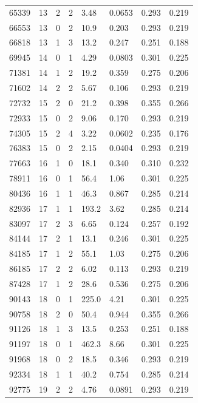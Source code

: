 \documentclass[preview]{standalone}
\begin{document}
{{{\begin{tabular}{L{1.2cm}C{1.2cm} C{0.3cm}C{0.5cm} C{1.4cm}C{1.4cm} C{1.4cm}C{1.4cm}}
  65339  &    13  & 2     &  2 &  3.48  & 0.0653  & 0.293 &  0.219   \\ 
  66553  &    13  & 0     &  2 &  10.9  & 0.203  & 0.293 &  0.219   \\ 
  66818  &    13  & 1     &  3 &  13.2  & 0.247  & 0.251 &  0.188   \\ 
  69945  &    14  & 0     &  1 &  4.29  & 0.0803  & 0.301 &  0.225   \\ 
  71381  &    14  & 1     &  2 &  19.2  & 0.359  & 0.275 &  0.206   \\ 
  71602  &    14  & 2     &  2 &  5.67  & 0.106  & 0.293 &  0.219   \\ 
  72732  &    15  & 2     &  0 &  21.2  & 0.398  & 0.355 &  0.266   \\ 
  72933  &    15  & 0     &  2 &  9.06  & 0.170  & 0.293 &  0.219   \\ 
  74305  &    15  & 2     &  4 &  3.22  & 0.0602  & 0.235 &  0.176   \\ 
  76383  &    15  & 0     &  2 &  2.15  & 0.0404  & 0.293 &  0.219   \\ 
  77663  &    16  & 1     &  0 &  18.1  & 0.340  & 0.310 &  0.232   \\ 
  78911  &    16  & 0     &  1 &  56.4  & 1.06  & 0.301 &  0.225   \\ 
  80436  &    16  & 1     &  1 &  46.3  & 0.867  & 0.285 &  0.214   \\ 
  82936  &    17  & 1     &  1 &  193.2  & 3.62  & 0.285 &  0.214   \\ 
  83097  &    17  & 2     &  3 &  6.65  & 0.124  & 0.257 &  0.192   \\ 
  84144  &    17  & 2     &  1 &  13.1  & 0.246  & 0.301 &  0.225   \\ 
  84185  &    17  & 1     &  2 &  55.1  & 1.03  & 0.275 &  0.206   \\ 
  86185  &    17  & 2     &  2 &  6.02  & 0.113  & 0.293 &  0.219   \\ 
  87428  &    17  & 1     &  2 &  28.6  & 0.536  & 0.275 &  0.206   \\ 
  90143  &    18  & 0     &  1 &  225.0  & 4.21  & 0.301 &  0.225   \\ 
  90758  &    18  & 2     &  0 &  50.4  & 0.944  & 0.355 &  0.266   \\ 
  91126  &    18  & 1     &  3 &  13.5  & 0.253  & 0.251 &  0.188   \\ 
  91197  &    18  & 0     &  1 &  462.3  & 8.66  & 0.301 &  0.225   \\ 
  91968  &    18  & 0     &  2 &  18.5  & 0.346  & 0.293 &  0.219   \\ 
  92334  &    18  & 1     &  1 &  40.2  & 0.754  & 0.285 &  0.214   \\ 
  92775  &    19  & 2     &  2 &  4.76  & 0.0891  & 0.293 &  0.219   \\ 
\hline 
\end{tabular} 

}}}
\end{document}
